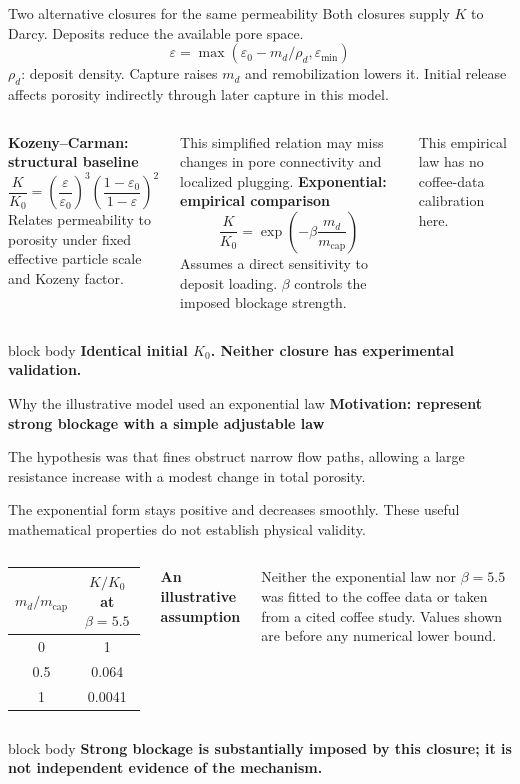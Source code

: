 \documentclass[aspectratio=169,11pt]{beamer}
\newcommand{\hi}[1]{\textcolor{tumblue}{\textbf{#1}}}
\newcommand{\takeaway}[1]{%
  \begin{beamercolorbox}[rounded=true,sep=.55em]{block body}
    \centering\color{tumdark}\textbf{#1}
  \end{beamercolorbox}}
\begin{document}
\begin{frame}{Two alternative closures for the same permeability}
\small
Both closures supply $K$ to Darcy. Deposits reduce the available pore space.
\[\varepsilon=\max\left(\varepsilon_0-m_d/\rho_d,\varepsilon_{\min}\right)\]
$\rho_d$: deposit density. Capture raises $m_d$ and remobilization lowers it.
Initial release affects porosity indirectly through later capture in this model.
\par\smallskip
\begin{columns}[T,onlytextwidth]
\hi{Kozeny--Carman: structural baseline}
\[\frac{K}{K_0}=\left(\frac{\varepsilon}{\varepsilon_0}\right)^3
\left(\frac{1-\varepsilon_0}{1-\varepsilon}\right)^2\]
Relates permeability to porosity under fixed effective particle scale and Kozeny factor.
\par\medskip This simplified relation may miss changes in pore connectivity and localized plugging.
\hi{Exponential: empirical comparison}
\[\frac{K}{K_0}=\exp\left(-\beta\frac{m_d}{m_{\mathrm{cap}}}\right)\]
Assumes a direct sensitivity to deposit loading. $\beta$ controls the imposed blockage strength.
\par\medskip This empirical law has no coffee-data calibration here.
\end{columns}
\vfill\takeaway{Identical initial $K_0$. Neither closure has experimental validation.}
\end{frame}

\begin{frame}{Why the illustrative model used an exponential law}
\small
\hi{Motivation: represent strong blockage with a simple adjustable law}
\par\medskip
The hypothesis was that fines obstruct narrow flow paths, allowing a large resistance increase with a modest change in total porosity.
\par\medskip
The exponential form stays positive and decreases smoothly. These useful mathematical properties do not establish physical validity.
\medskip
\begin{columns}[c,onlytextwidth]
\begin{tabular}{cc}\toprule
$m_d/m_{\mathrm{cap}}$ & $K/K_0$ at $\beta=5.5$\\\midrule
0 & 1\\[.35em]
0.5 & 0.064\\[.35em]
1 & 0.0041\\\bottomrule
\end{tabular}
\hi{An illustrative assumption}
\par\medskip
Neither the exponential law nor $\beta=5.5$ was fitted to the coffee data or taken from a cited coffee study. Values shown are before any numerical lower bound.
\end{columns}
\vfill\takeaway{Strong blockage is substantially imposed by this closure; it is not independent evidence of the mechanism.}
\end{frame}
\end{document}

